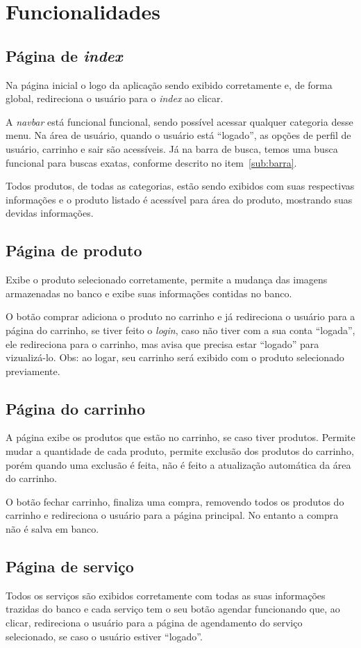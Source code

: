 \chapter{Funcionalidades}
\section{Página de \emph{index}}
Na página inicial o logo da aplicação sendo exibido corretamente e, de forma global, redireciona o usuário para o \emph{index} ao clicar.

A \emph{navbar} está funcional funcional, sendo possível acessar qualquer categoria desse menu. Na área de usuário, quando o usuário está “logado”, as opções de perfil de usuário, carrinho e sair são acessíveis. Já na barra de busca, temos uma busca funcional para buscas exatas, conforme descrito no item~\ref{sub:barra}.

Todos produtos, de todas as categorias, estão sendo exibidos com suas respectivas informações e o produto listado é acessível para área do produto, mostrando suas devidas informações.

\section{Página de produto}
Exibe o produto selecionado corretamente, permite a mudança das imagens armazenadas no banco e exibe suas informações contidas no banco.

O botão comprar adiciona o produto no carrinho e já redireciona o usuário para a página do carrinho, se tiver feito o \emph{login}, caso não tiver com a sua conta “logada”, ele redireciona para o carrinho, mas avisa que precisa estar “logado” para vizualizá-lo. Obs: ao logar, seu carrinho será exibido com o produto selecionado previamente.

\section{Página do carrinho}
A página exibe os produtos que estão no carrinho, se caso tiver produtos. Permite mudar a quantidade de cada produto, permite exclusão dos produtos do carrinho, porém quando uma exclusão é feita, não é feito a atualização automática da área do carrinho.

O botão fechar carrinho, finaliza uma compra, removendo todos os produtos do carrinho e redireciona o usuário para  a página principal. No entanto a compra não é salva em banco.

\section{Página de serviço}
Todos os serviços são exibidos corretamente com todas as suas informações trazidas do banco e cada serviço tem o seu botão agendar funcionando que, ao clicar, redireciona o usuário para a página de agendamento do serviço selecionado, se caso o usuário estiver “logado”.

